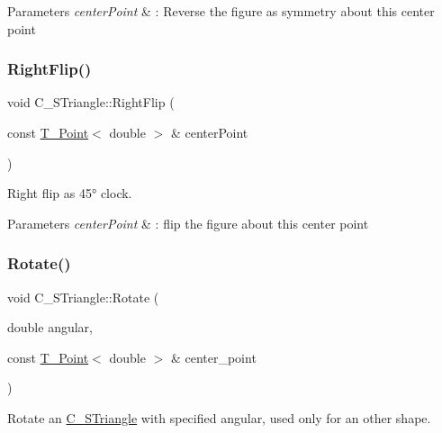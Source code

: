 \begin{DoxyParams}{Parameters}
{\em center\+Point} & \+: Reverse the figure as symmetry about this center point \\
\hline
\end{DoxyParams}
\mbox{\label{classC__STriangle_ad84c7c6c2a4ca6d2fd3a681fd6dfcf63}} 
\subsubsection{\texorpdfstring{Right\+Flip()}{RightFlip()}}
{\footnotesize\ttfamily void C\+\_\+\+S\+Triangle\+::\+Right\+Flip (\begin{DoxyParamCaption}\item[{const \hyperlink{classT__Point}{T\+\_\+\+Point}$<$ double $>$ \&}]{center\+Point }\end{DoxyParamCaption})}



Right flip as 45° clock. 


\begin{DoxyParams}{Parameters}
{\em center\+Point} & \+: flip the figure about this center point \\
\hline
\end{DoxyParams}
\mbox{\label{classC__STriangle_afe6a1fcb5bf97792dd38e698bb6ad0cd}} 
\subsubsection{\texorpdfstring{Rotate()}{Rotate()}}
{\footnotesize\ttfamily void C\+\_\+\+S\+Triangle\+::\+Rotate (\begin{DoxyParamCaption}\item[{double}]{angular,  }\item[{const \hyperlink{classT__Point}{T\+\_\+\+Point}$<$ double $>$ \&}]{center\+\_\+point }\end{DoxyParamCaption})}



Rotate an \hyperlink{classC__STriangle}{C\+\_\+\+S\+Triangle} with specified angular, used only for an other shape. 


